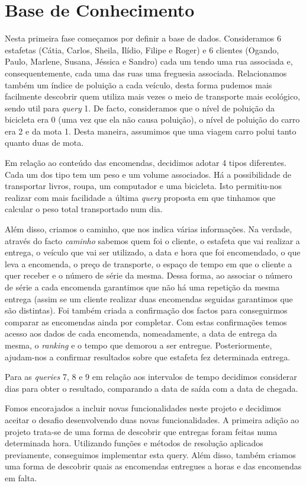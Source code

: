 \documentclass[a4paper,12pt]{article}
\begin{document}
\newpage

\section{Base de Conhecimento}
	Nesta primeira fase começamos por definir a base de dados. Consideramos 6 estafetas (Cátia, Carlos, Sheila, Ilídio, Filipe e Roger) e 6 clientes (Ogando, Paulo, Marlene, Susana, Jéssica e Sandro) cada um tendo uma rua associada e,  consequentemente, cada uma das ruas uma freguesia associada. Relacionamos também um índice de poluição a cada veículo, desta forma pudemos mais facilmente descobrir quem utiliza mais vezes o meio de transporte mais ecológico, sendo util para \emph{query} 1. De facto, consideramos que o nível de poluição da bicicleta era 0 (uma vez que ela não causa poluição), o nível de poluição do carro era 2 e da mota 1. Desta maneira, assumimos que uma viagem carro polui tanto quanto duas de mota.\par
	Em relação ao conteúdo das encomendas, decidimos adotar 4 tipos diferentes. Cada um dos tipo tem um peso e um volume associados. Há a possibilidade de transportar livros, roupa, um computador e uma bicicleta. Isto permitiu-nos realizar com mais facilidade a última \emph{query} proposta em que tinhamos que calcular o peso total transportado num dia.\par
	Além disso, criamos o caminho, que nos indica várias informações. Na verdade, através do facto \emph{caminho} sabemos quem foi o cliente, o estafeta que vai realizar a entrega, o veículo que vai ser utilizado, a data e hora que foi encomendado, o que leva a encomenda, o preço de transporte, o espaço de tempo em que o cliente a quer receber e o número de série da mesma. Dessa forma, ao associar o número de série a cada encomenda garantimos que não há uma repetição da mesma entrega (assim se um cliente realizar duas encomendas seguidas garantimos que são distintas). Foi também criada a confirmação dos factos para conseguirmos comparar as encomendas ainda por completar. Com estas confirmações temos acesso aos dados de cada encomenda, nomeadamente, a data de entrega da mesma, o \emph{ranking} e o tempo que demorou a ser entregue. Posteriormente, ajudam-nos a confirmar resultados sobre que estafeta fez determinada entrega.\par
	Para as \emph{queries} 7, 8 e 9 em relação aos intervalos de tempo decidimos considerar dias para obter o resultado, comparando a data de saída com a data de chegada.\par
    Fomos encorajados a incluir novas funcionalidades neste projeto e decidimos aceitar o desafio desenvolvendo duas novas funcionalidades. A primeira adição ao projeto trata-se de uma forma de descobrir que entregas foram feitas numa determinada hora. Utilizando funções e métodos de resolução aplicados previamente, conseguimos implementar esta query. Além disso, também criamos uma forma de descobrir quais as encomendas entregues a horas e das encomendas em falta.\par
    
\end{document}
